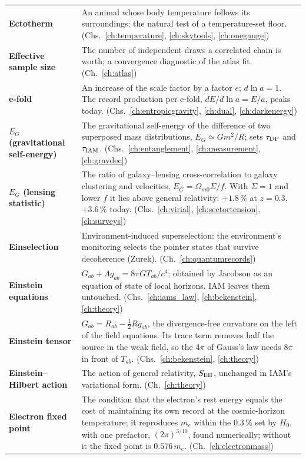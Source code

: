 {\begin{longtable}{@{}>{\raggedright\arraybackslash}p{}>{\raggedright\arraybackslash}p{}@{}}
\textbf{Ectotherm} & An animal whose body temperature follows its surroundings; the natural test of a temperature-set floor. {\footnotesize(Chs.~\ref{ch:temperature}, \ref{ch:skytools}, \ref{ch:onegauge})}\\[1pt]
\textbf{Effective sample size} & The number of independent draws a correlated chain is worth; a convergence diagnostic of the atlas fit. {\footnotesize(Ch.~\ref{ch:atlas})}\\[1pt]
\textbf{e-fold} & An increase of the scale factor by a factor $e$; $d\ln a=1$. The record production per e-fold, $dE/d\ln a=E/a$, peaks today. {\footnotesize(Chs.~\ref{ch:entropicgravity}, \ref{ch:dual}, \ref{ch:darkenergy})}\\[1pt]
\textbf{$E_G$ (gravitational self-energy)} & The gravitational self-energy of the difference of two superposed mass distributions, $E_G\simeq Gm^2/R$; sets $\tau_{\rm DP}$ and $\tau_{\rm IAM}$. {\footnotesize(Chs.~\ref{ch:entanglement}, \ref{ch:measurement}, \ref{ch:gravdec})}\\[1pt]
\textbf{$E_G$ (lensing statistic)} & The ratio of galaxy--lensing cross-correlation to galaxy clustering and velocities, $E_G=\Omega_{m0}\Sigma/f$. With $\Sigma=1$ and lower $f$ it lies above general relativity: $+1.8\,\%$ at $z=0.3$, $+3.6\,\%$ today. {\footnotesize(Chs.~\ref{ch:virial}, \ref{ch:sectortension}, \ref{ch:surveys})}\\[1pt]
\textbf{Einselection} & Environment-induced superselection: the environment's monitoring selects the pointer states that survive decoherence (Zurek). {\footnotesize(Ch.~\ref{ch:quantumrecords})}\\[1pt]
\textbf{Einstein equations} & $G_{ab}+\Lambda g_{ab}=8\pi GT_{ab}/c^4$; obtained by Jacobson as an equation of state of local horizons. IAM leaves them untouched. {\footnotesize(Chs.~\ref{ch:iams_law}, \ref{ch:bekenstein}, \ref{ch:theory})}\\[1pt]
\textbf{Einstein tensor} & $G_{ab}=R_{ab}-\tfrac12Rg_{ab}$, the divergence-free curvature on the left of the field equations. Its trace term removes half the source in the weak field, so the $4\pi$ of Gauss's law needs $8\pi$ in front of $T_{ab}$. {\footnotesize(Chs.~\ref{ch:bekenstein}, \ref{ch:theory})}\\[1pt]
\textbf{Einstein--Hilbert action} & The action of general relativity, $S_{\rm EH}$, unchanged in IAM's variational form. {\footnotesize(Ch.~\ref{ch:theory})}\\[1pt]
\textbf{Electron fixed point} & The condition that the electron's rest energy equals the cost of maintaining its own record at the cosmic-horizon temperature; it reproduces $m_e$ within the 0.3\,\% set by $H_0$, with one prefactor, $(2\pi)^{3/10}$, found numerically; without it the fixed point is $0.576\,m_e$. {\footnotesize(Ch.~\ref{ch:electronmass})}\\[1pt]

\end{longtable}}
